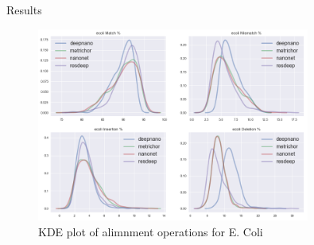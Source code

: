 \documentclass[10pt]{beamer}
\begin{document}
\begin{frame}[fragile]{Results}
	\begin{figure}[!htb]
		\begin{center}
			\includegraphics[width=0.8\textwidth]{imgs/results/kde_cigar.png}
			\caption{KDE plot of alimnment operations for E. Coli}
			\label{fg:consensus}
		\end{center}
	\end{figure}

	
\end{frame}
\end{document}
